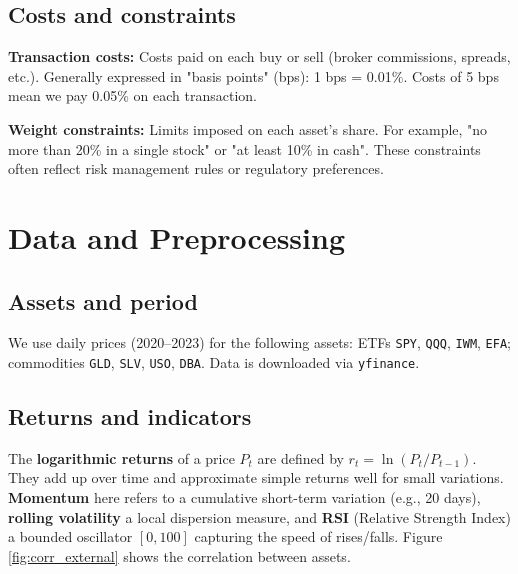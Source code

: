 \documentclass[11pt,a4paper]{article}
\begin{document}
\subsection{Costs and constraints}

\textbf{Transaction costs:} Costs paid on each buy or sell (broker commissions, spreads, etc.). Generally expressed in "basis points" (bps): 1 bps = 0.01\%. Costs of 5 bps mean we pay 0.05\% on each transaction.

\textbf{Weight constraints:} Limits imposed on each asset's share. For example, "no more than 20\% in a single stock" or "at least 10\% in cash". These constraints often reflect risk management rules or regulatory preferences.

\section{Data and Preprocessing}
\subsection{Assets and period}
We use daily prices (2020--2023) for the following assets: ETFs \texttt{SPY}, \texttt{QQQ}, \texttt{IWM}, \texttt{EFA}; commodities \texttt{GLD}, \texttt{SLV}, \texttt{USO}, \texttt{DBA}. Data is downloaded via \texttt{yfinance}.

\subsection{Returns and indicators}
The \textbf{logarithmic returns} of a price \(P_t\) are defined by \(r_t = \ln(P_t/P_{t-1})\). They add up over time and approximate simple returns well for small variations.
\textbf{Momentum} here refers to a cumulative short-term variation (e.g., 20 days), \textbf{rolling volatility} a local dispersion measure, and \textbf{RSI} (Relative Strength Index) a bounded oscillator \([0,100]\) capturing the speed of rises/falls. Figure \ref{fig:corr_external} shows the correlation between assets.
\end{document}

